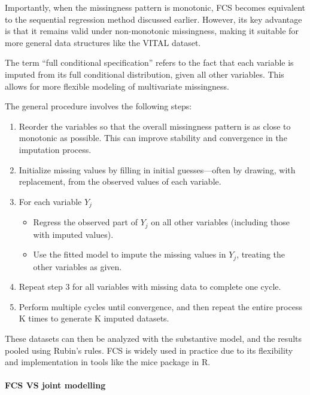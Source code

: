 \documentclass{article}
\providecommand{\tightlist}{%
  \setlength{\itemsep}{0pt}\setlength{\parskip}{0pt}}
\begin{document}
Importantly, when the missingness pattern is monotonic, FCS becomes
equivalent to the sequential regression method discussed earlier.
However, its key advantage is that it remains valid under non-monotonic
missingness, making it suitable for more general data structures like
the VITAL dataset.

The term ``full conditional specification'' refers to the fact that each
variable is imputed from its full conditional distribution, given all
other variables. This allows for more flexible modeling of multivariate
missingness.

The general procedure involves the following steps:

\begin{enumerate}
\def\labelenumi{\arabic{enumi}.}
\item
  Reorder the variables so that the overall missingness pattern is as
  close to monotonic as possible. This can improve stability and
  convergence in the imputation process.
\item
  Initialize missing values by filling in initial guesses---often by
  drawing, with replacement, from the observed values of each variable.
\item
  For each variable \(Y_{j}\)

  \begin{itemize}
  \tightlist
  \item
    Regress the observed part of \(Y_{j}\) on all other variables
    (including those with imputed values).
  \item
    Use the fitted model to impute the missing values in \(Y_{j}\),
    treating the other variables as given.
  \end{itemize}
\item
  Repeat step 3 for all variables with missing data to complete one
  cycle.
\item
  Perform multiple cycles until convergence, and then repeat the entire
  process K times to generate K imputed datasets.
\end{enumerate}

These datasets can then be analyzed with the substantive model, and the
results pooled using Rubin's rules. FCS is widely used in practice due
to its flexibility and implementation in tools like the mice package in
R.

\paragraph{FCS VS joint modelling}\label{fcs-vs-joint-modelling}
\end{document}
